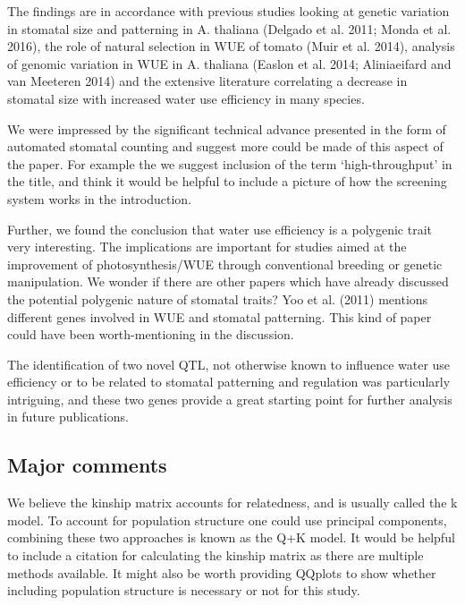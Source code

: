 \documentclass[10pt]{article}
\begin{document}
\par\null

The findings are in accordance with previous studies looking at genetic
variation in stomatal size and patterning in A. thaliana (Delgado et al.
2011; Monda et al. 2016), the role of natural selection in WUE of tomato
(Muir et al. 2014), analysis of genomic variation in WUE in A. thaliana
(Easlon et al. 2014; Aliniaeifard and van Meeteren 2014) and the
extensive literature correlating a decrease in stomatal size with
increased water use efficiency in many species.

We were impressed by the significant technical advance presented in the
form of automated stomatal counting and suggest more could be made of
this aspect of the paper. For example the we suggest inclusion of the
term `high-throughput' in the title, and think it would be helpful to
include a picture of how the screening system works in the introduction.

\par\null

Further, we found the conclusion that water use efficiency is a
polygenic trait very interesting. The implications are important for
studies aimed at the improvement of photosynthesis/WUE through
conventional breeding or genetic manipulation. We wonder if there are
other papers which have already discussed the potential polygenic nature
of stomatal traits? Yoo et al. (2011) mentions different genes involved
in WUE and stomatal patterning. This kind of paper could have been
worth-mentioning in the discussion.

\par\null

The identification of two novel QTL, not otherwise known to influence
water use efficiency or to be related to stomatal patterning and
regulation was particularly intriguing, and these two genes provide a
great starting point for further analysis in future publications.

\par\null

\subsection*{Major comments}

{\label{289590}}

We believe the kinship matrix accounts for relatedness, and is usually
called the k model. To account for population structure one could use
principal components, combining these two approaches is known as the Q+K
model. It would be helpful to include a citation for calculating the
kinship matrix as there are multiple methods available. It might also be
worth providing QQplots to show whether including population structure
is necessary or not for this study.
\end{document}
